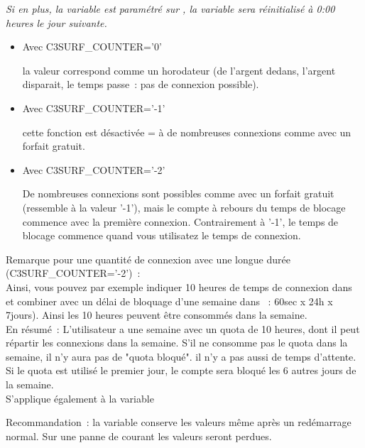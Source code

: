 \begin{itemize}
\begin{description}
   \emph{Si en plus, la variable est paramétré sur ,
   la variable  sera réinitialisé à 0:00 heures
   le jour suivante.}

  \begin{itemize}
    \item{Avec C3SURF\_COUNTER='0'}

    la valeur correspond comme un horodateur (de l'argent dedans, l'argent disparait,
	le temps passe~: pas de connexion possible).

    \item{Avec C3SURF\_COUNTER='-1'}

    cette fonction est désactivée = à de nombreuses connexions comme avec un forfait
	gratuit.

    \item{Avec C3SURF\_COUNTER='-2'}

    De nombreuses connexions sont possibles comme avec un forfait gratuit (ressemble à
	la valeur '-1'), mais le compte à rebours du temps de blocage commence avec
	la première connexion. Contrairement à '-1', le temps de blocage commence quand
	vous utilisatez le temps de connexion.
  \end{itemize}

   Remarque pour une quantité de connexion avec une longue durée (C3SURF\_COUNTER='-2')~:\\
   Ainsi, vous pouvez par exemple indiquer 10 heures de temps de connexion dans
    et combiner avec un délai de bloquage
   d'une semaine dans ~:
   60sec x 24h x 7jours). Ainsi les 10 heures peuvent être consommés dans la semaine.\\
   En résumé~: L'utilisateur a une semaine avec un quota de 10 heures, dont il peut répartir
   les connexions dans la semaine. S'il ne consomme pas le quota dans la semaine, il n'y aura
   pas de "quota bloqué". il n'y a pas aussi de temps d'attente. Si le quota est utilisé
   le premier jour, le compte sera bloqué les 6 autres jours de la semaine.\\
   S'applique également à la variable 

   Recommandation~: la variable 
   conserve les valeurs même après un redémarrage normal. Sur une panne de courant les
   valeurs seront perdues.


\end{description}
\end{itemize}
